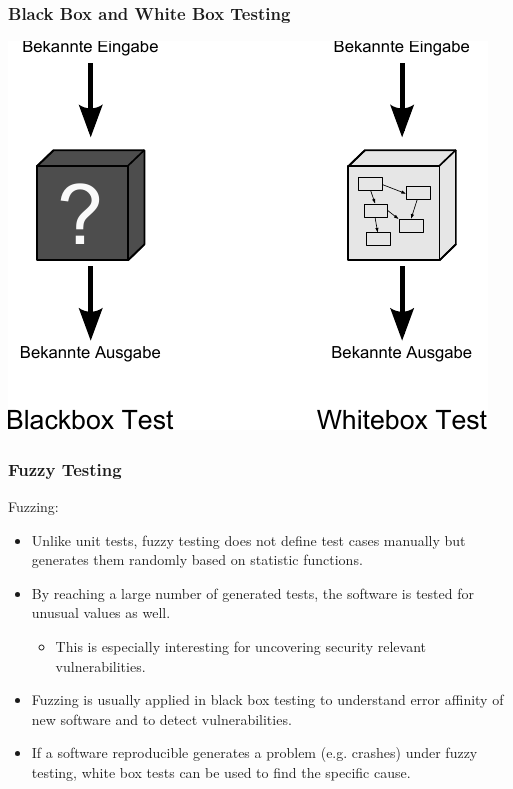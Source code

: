\begin{frame}
\frametitle{Black Box and White Box Testing}
  \begin{center}
  \includegraphics[width=.8\textwidth]{images/Qualitaetssicherung/abbildungen/BlackBoxAndWhiteBoxTesting}
  \end{center}
\end{frame}


\begin{frame}
\frametitle{Fuzzy Testing}
Fuzzing:
\begin{itemize}
	\item Unlike unit tests, fuzzy testing does not define test cases manually but generates them randomly based on statistic functions.
	\item By reaching a large number of generated tests, the software is tested for unusual values as well.
\begin{itemize}
	\item This is especially interesting for uncovering security relevant vulnerabilities.
\end{itemize}
\item Fuzzing is usually applied in black box testing to understand error affinity of new software and to detect vulnerabilities.
\item If a software reproducible generates a problem (e.g. crashes) under fuzzy testing, white box tests can be used to find the specific cause. 
\end{itemize}
\end{frame}


